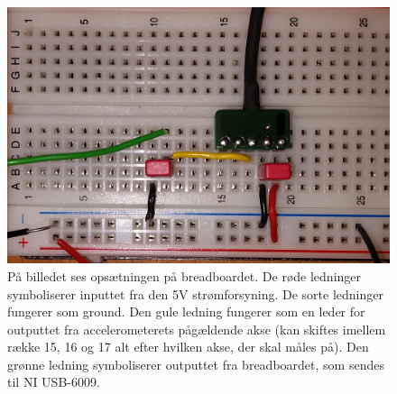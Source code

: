 \begin{figure}[H]
	\centering
	\includegraphics[scale=0.15]{figures/cProblemloesning/PF2.jpg}
	\caption{På billedet ses opsætningen på breadboardet. De røde ledninger symboliserer inputtet fra den 5V strømforsyning. De sorte ledninger fungerer som ground. Den gule ledning fungerer som en leder for outputtet fra accelerometerets pågældende akse (kan skiftes imellem række 15, 16 og 17 alt efter hvilken akse, der skal måles på). Den grønne ledning symboliserer outputtet fra breadboardet, som sendes til NI USB-6009.}
	\label{pforsoeg1}
\end{figure}

